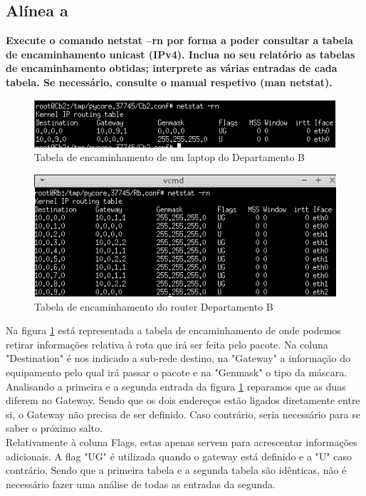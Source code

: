 \documentclass[a4paper]{report}
\begin{document}
\subsection{Alínea a}
\textbf{Execute o comando netstat –rn por forma a poder consultar a tabela de
encaminhamento unicast (IPv4). Inclua no seu relatório as tabelas de
encaminhamento obtidas; interprete as várias entradas de cada tabela. Se
necessário, consulte o manual respetivo (man netstat).}

\begin{figure}[H]
    \centering 
    \includegraphics[width=\textwidth]{images/netstatPcEx2P2.png}
    \caption{Tabela de encaminhamento de um laptop do Departamento B}
    \label{fig:netstatPcEx2P2}
\end{figure}

\begin{figure}[H]
    \centering 
    \includegraphics[width=\textwidth]{images/netstatRouterEx2P2.png}
    \caption{Tabela de encaminhamento do router Departamento B}
    \label{fig:netstatRouterEx2P2}
\end{figure}
Na figura \ref{fig:netstatPcEx2P2} está representada a tabela de encaminhamento
de onde podemos retirar informações relativa à rota que irá ser feita pelo
pacote. Na coluna "Destination" é nos indicado a sub-rede destino, na "Gateway"
a informação do equipamento pelo qual irá passar o pacote e na "Genmask" o tipo
da máscara.\\
Analisando a primeira e a segunda entrada da figura \ref{fig:netstatPcEx2P2} 
reparamos que as duas diferem no Gateway. Sendo que os dois endereços estão
ligados diretamente entre si, o Gateway não precisa de ser definido. Caso
contrário, seria necessário para se saber o próximo salto.\\
Relativamente à coluna Flags, estas apenas servem para acrescentar informações
adicionais. A flag "UG" é utilizada quando o gateway está definido e a "U" caso
contrário. Sendo que a primeira tabela e a segunda tabela são idênticas, não é
necessário fazer uma análise de todas as entradas da segunda.
\end{document}
